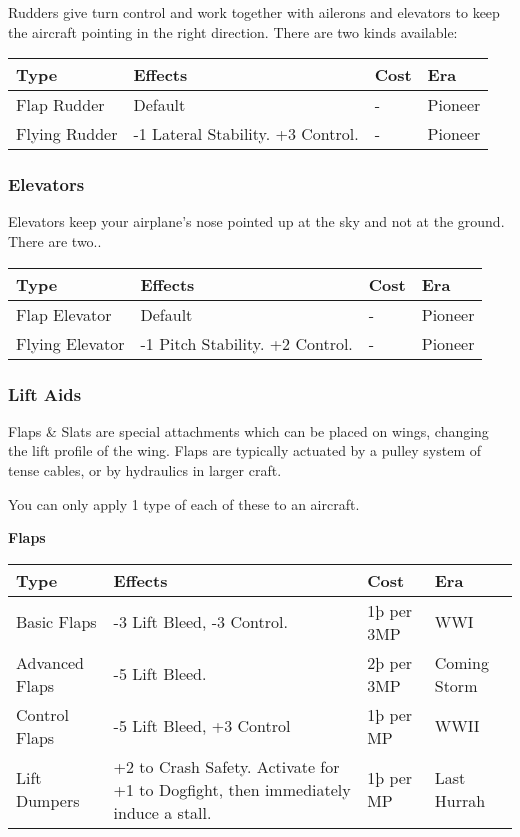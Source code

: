 \documentclass{article}
\begin{document}
Rudders give turn control and work together with ailerons and elevators
to keep the aircraft pointing in the right direction. There are two
kinds available:

\begin{tabular}{|l|l|l|l|}
    \hline
    Type          & Effects                           & Cost & Era     \\\hline
    Flap Rudder   & Default                           & -    & Pioneer \\\hline
    Flying Rudder & -1 Lateral Stability. +3 Control. & -    & Pioneer \\\hline
\end{tabular}

\subsubsection{Elevators}
\label{_Elevators}

Elevators keep your airplane's nose pointed up at the sky and not at the
ground. There are two..

\begin{tabular}{|l|l|l|l|}
    \hline
    Type            & Effects                         & Cost & Era     \\\hline
    Flap Elevator   & Default                         & -    & Pioneer \\\hline
    Flying Elevator & -1 Pitch Stability. +2 Control. & -    & Pioneer \\\hline
\end{tabular}

\subsubsection{Lift Aids}
\label{_Lift_Aids}

Flaps \& Slats are special attachments which can be placed on wings,
changing the lift profile of the wing. Flaps are typically actuated by a
pulley system of tense cables, or by hydraulics in larger craft.

You can only apply 1 type of each of these to an aircraft.

\textbf{Flaps}

\begin{tabular}{|l|l|l|l|}
    \hline
    Type                        & Effects                                               & Cost        & Era          \\\hline
    Basic Flaps                 & -3 Lift Bleed, -3 Control.                            & 1þ per 3MP  & WWI          \\\hline
    Advanced Flaps              & -5 Lift Bleed.                                        & 2þ per 3MP  & Coming Storm \\\hline
    Control Flaps               & -5 Lift Bleed, +3 Control                             & 1þ per MP   & WWII         \\\hline
    Lift Dumpers                & +2 to Crash Safety. Activate for +1 to Dogfight, then
    immediately induce a stall. & 1þ per MP                                             & Last Hurrah                \\\hline
\end{tabular}
\end{document}
